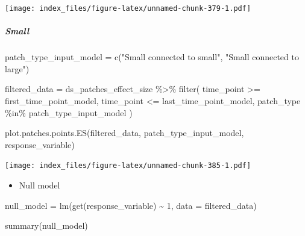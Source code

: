 \documentclass[
]{article}
\newenvironment{Shaded}{\begin{snugshade}}{\end{snugshade}}
\newcommand{\AttributeTok}[1]{\textcolor[rgb]{0.77,0.63,0.00}{#1}}
\newcommand{\DecValTok}[1]{\textcolor[rgb]{0.00,0.00,0.81}{#1}}
\newcommand{\FunctionTok}[1]{\textcolor[rgb]{0.00,0.00,0.00}{#1}}
\newcommand{\NormalTok}[1]{#1}
\newcommand{\OtherTok}[1]{\textcolor[rgb]{0.56,0.35,0.01}{#1}}
\newcommand{\SpecialCharTok}[1]{\textcolor[rgb]{0.00,0.00,0.00}{#1}}
\newcommand{\StringTok}[1]{\textcolor[rgb]{0.31,0.60,0.02}{#1}}
\providecommand{\tightlist}{%
  \setlength{\itemsep}{0pt}\setlength{\parskip}{0pt}}
\begin{document}
\texttt{[image: index\_files/figure-latex/unnamed-chunk-379-1.pdf]}

\hypertarget{small-1}{%
\subparagraph{Small}\label{small-1}}

\begin{Shaded}
\begin{Highlighting}[]
\NormalTok{patch\_type\_input\_model }\OtherTok{=} \FunctionTok{c}\NormalTok{(}\StringTok{"Small connected to small"}\NormalTok{,}
                           \StringTok{"Small connected to large"}\NormalTok{)}
\end{Highlighting}
\end{Shaded}

\begin{Shaded}
\begin{Highlighting}[]
\NormalTok{filtered\_data }\OtherTok{=}\NormalTok{ ds\_patches\_effect\_size }\SpecialCharTok{\%\textgreater{}\%}
  \FunctionTok{filter}\NormalTok{(}
\NormalTok{    time\_point }\SpecialCharTok{\textgreater{}=}\NormalTok{ first\_time\_point\_model,}
\NormalTok{    time\_point }\SpecialCharTok{\textless{}=}\NormalTok{ last\_time\_point\_model,}
\NormalTok{    patch\_type }\SpecialCharTok{\%in\%}\NormalTok{ patch\_type\_input\_model}
\NormalTok{  )}
\end{Highlighting}
\end{Shaded}

\begin{Shaded}
\begin{Highlighting}[]
\FunctionTok{plot.patches.points.ES}\NormalTok{(filtered\_data,}
\NormalTok{                       patch\_type\_input\_model,}
\NormalTok{                       response\_variable)}
\end{Highlighting}
\end{Shaded}

\texttt{[image: index\_files/figure-latex/unnamed-chunk-385-1.pdf]}

\begin{itemize}
\tightlist
\item
  Null model
\end{itemize}

\begin{Shaded}
\begin{Highlighting}[]
\NormalTok{null\_model }\OtherTok{=} \FunctionTok{lm}\NormalTok{(}\FunctionTok{get}\NormalTok{(response\_variable) }\SpecialCharTok{\textasciitilde{}}
                  \DecValTok{1}\NormalTok{,}
                \AttributeTok{data =}\NormalTok{ filtered\_data)}

\FunctionTok{summary}\NormalTok{(null\_model)}
\end{Highlighting}
\end{Shaded}
\end{document}
